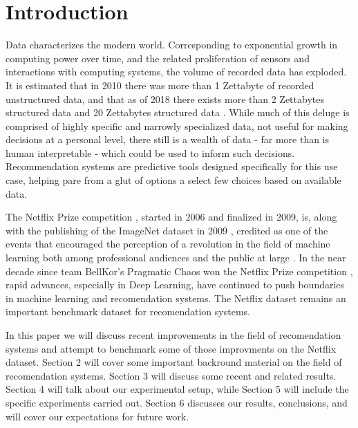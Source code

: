 \section{Introduction}
	Data characterizes the modern world. Corresponding to exponential growth in computing power over time, and the related proliferation of sensors and interactions with computing systems, the volume of recorded data has exploded. It is estimated that in 2010 there was more than 1 Zettabyte of recorded unstructured data, and that as of 2018 there exists more than 2 Zettabytes structured data and 20 Zettabytes structured data \cite{dataage2025}\cite{dataRizzatti}. While much of this deluge is comprised of highly specific and narrowly specialized data, not useful for making decisions at a personal level, there still is a wealth of data - far more than is human interpretable - which could be used to inform such decisions. Recommendation systems are predictive tools designed specifically for this use case, helping pare from a glut of options a select few choices based on available data.\par
The Netflix Prize competition \cite{netflixPrize}, started in 2006 and finalized in 2009, is, along with the publishing of the ImageNet dataset in 2009 \cite{imagenet}, credited as one of the events that encouraged the perception of a revolution in the field of machine learning both among professional audiences and the public at large \cite{imagenetReasons}. In the near decade since team BellKor's Pragmatic Chaos won the Netflix Prize competition \cite{netflixPrize}, rapid advances, especially in Deep Learning, have continued to push boundaries in machine learning and recomendation systems. The Netflix dataset remains an important benchmark dataset for recomendation systems.\par
In this paper we will discuss recent improvements in the field of recomendation systems and attempt to benchmark some of those improvments on the Netflix dataset. Section 2 will cover some important backround material on the field of recomendation systems. Section 3 will discuss some recent and related results. Section 4 will talk about our experimental setup, while Section 5 will include the specific experiments carried out. Section 6 discusses our results, conclusions, and will cover our expectations for future work.

